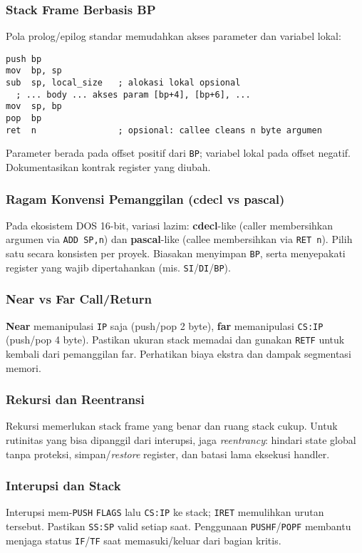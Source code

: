 \documentclass[../main.tex]{subfiles}
\begin{document}
\subsubsection{Stack Frame Berbasis BP}
Pola prolog/epilog standar memudahkan akses parameter dan variabel lokal:
\begin{verbatim}
push bp
mov  bp, sp
sub  sp, local_size   ; alokasi lokal opsional
  ; ... body ... akses param [bp+4], [bp+6], ...
mov  sp, bp
pop  bp
ret  n                ; opsional: callee cleans n byte argumen
\end{verbatim}
Parameter berada pada offset positif dari \texttt{BP}; variabel lokal pada offset negatif. Dokumentasikan kontrak register yang diubah.

\subsubsection{Ragam Konvensi Pemanggilan (cdecl vs pascal)}
Pada ekosistem DOS 16-bit, variasi lazim: \textbf{cdecl}-like (caller membersihkan argumen via \texttt{ADD SP,n}) dan \textbf{pascal}-like (callee membersihkan via \texttt{RET n}). Pilih satu secara konsisten per proyek. Biasakan menyimpan \texttt{BP}, serta menyepakati register yang wajib dipertahankan (mis. \texttt{SI}/\texttt{DI}/\texttt{BP}).

\subsubsection{Near vs Far Call/Return}
\textbf{Near} memanipulasi \texttt{IP} saja (push/pop 2 byte), \textbf{far} memanipulasi \texttt{CS:IP} (push/pop 4 byte). Pastikan ukuran stack memadai dan gunakan \texttt{RETF} untuk kembali dari pemanggilan far. Perhatikan biaya ekstra dan dampak segmentasi memori.

\subsubsection{Rekursi dan Reentransi}
Rekursi memerlukan stack frame yang benar dan ruang stack cukup. Untuk rutinitas yang bisa dipanggil dari interupsi, jaga \textit{reentrancy}: hindari state global tanpa proteksi, simpan/\textit{restore} register, dan batasi lama eksekusi handler.

\subsubsection{Interupsi dan Stack}
Interupsi mem-\texttt{PUSH} \texttt{FLAGS} lalu \texttt{CS:IP} ke stack; \texttt{IRET} memulihkan urutan tersebut. Pastikan \texttt{SS:SP} valid setiap saat. Penggunaan \texttt{PUSHF}/\texttt{POPF} membantu menjaga status \texttt{IF}/\texttt{TF} saat memasuki/keluar dari bagian kritis.
\end{document}
